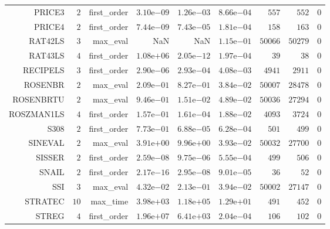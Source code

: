 \begin{longtable}{rrrrrrrrr}
PRICE3 & \(     2\) & first\_order & \( 3.10\)e\(-09\) & \( 1.26\)e\(-03\) & \( 8.66\)e\(-04\) & \(   557\) & \(   552\) & \(     0\) \\
PRICE4 & \(     2\) & first\_order & \( 7.44\)e\(-09\) & \( 7.43\)e\(-05\) & \( 1.81\)e\(-04\) & \(   158\) & \(   163\) & \(     0\) \\
RAT42LS & \(     3\) & max\_eval &       NaN &       NaN & \( 1.15\)e\(-01\) & \( 50066\) & \( 50279\) & \(     0\) \\
RAT43LS & \(     4\) & first\_order & \( 1.08\)e\(+06\) & \( 2.05\)e\(-12\) & \( 1.97\)e\(-04\) & \(    39\) & \(    38\) & \(     0\) \\
RECIPELS & \(     3\) & first\_order & \( 2.90\)e\(-06\) & \( 2.93\)e\(-04\) & \( 4.08\)e\(-03\) & \(  4941\) & \(  2911\) & \(     0\) \\
ROSENBR & \(     2\) & max\_eval & \( 2.09\)e\(-01\) & \( 8.27\)e\(-01\) & \( 3.84\)e\(-02\) & \( 50007\) & \( 28478\) & \(     0\) \\
ROSENBRTU & \(     2\) & max\_eval & \( 9.46\)e\(-01\) & \( 1.51\)e\(-02\) & \( 4.89\)e\(-02\) & \( 50036\) & \( 27294\) & \(     0\) \\
ROSZMAN1LS & \(     4\) & first\_order & \( 1.57\)e\(-01\) & \( 1.61\)e\(-04\) & \( 1.88\)e\(-02\) & \(  4093\) & \(  3724\) & \(     0\) \\
S308 & \(     2\) & first\_order & \( 7.73\)e\(-01\) & \( 6.88\)e\(-05\) & \( 6.28\)e\(-04\) & \(   501\) & \(   499\) & \(     0\) \\
SINEVAL & \(     2\) & max\_eval & \( 3.91\)e\(+00\) & \( 9.96\)e\(+00\) & \( 3.93\)e\(-02\) & \( 50032\) & \( 27700\) & \(     0\) \\
SISSER & \(     2\) & first\_order & \( 2.59\)e\(-08\) & \( 9.75\)e\(-06\) & \( 5.55\)e\(-04\) & \(   499\) & \(   506\) & \(     0\) \\
SNAIL & \(     2\) & first\_order & \( 2.17\)e\(-16\) & \( 2.95\)e\(-08\) & \( 9.01\)e\(-05\) & \(    36\) & \(    52\) & \(     0\) \\
SSI & \(     3\) & max\_eval & \( 4.32\)e\(-02\) & \( 2.13\)e\(-01\) & \( 3.94\)e\(-02\) & \( 50002\) & \( 27147\) & \(     0\) \\
STRATEC & \(    10\) & max\_time & \( 3.98\)e\(+03\) & \( 1.18\)e\(+05\) & \( 1.29\)e\(+01\) & \(   491\) & \(   452\) & \(     0\) \\
STREG & \(     4\) & first\_order & \( 1.96\)e\(+07\) & \( 6.41\)e\(+03\) & \( 2.04\)e\(-04\) & \(   106\) & \(   102\) & \(     0\) \\

\end{longtable}

